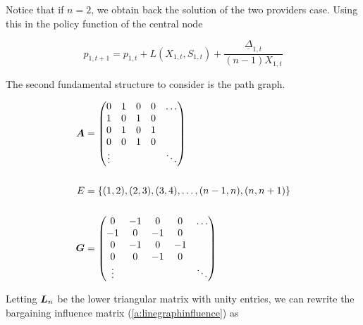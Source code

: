 Notice that if $n = 2$, we obtain back the solution of the two providers case. Using this in the policy function of the central node

\begin{equation} \label{policy_star}
  p_{1, t+1} = p_{1, t} + L(X_{1, t}, S_{1, t}) + \frac{\underline{\Delta}_{1, t}}{(n-1) X_{1, t}}
\end{equation}

The second fundamental structure to consider is the path graph.

\vspace{5mm}
\begin{minipage}{.5\textwidth}
  \resizebox{\textwidth}{!}{}
\end{minipage}
\begin{minipage}{.5\textwidth}
  \begin{equation*}
    \begin{split}
      \matr{A} &= \begin{pmatrix}
        0      & 1 & 0 & 0 & \ldots \\
        1      & 0 & 1 & 0 &        \\
        0      & 1 & 0 & 1 &        \\
        0      & 0 & 1 & 0 &        \\
        \vdots &   &   &   & \ddots
      \end{pmatrix} \\
      \vspace{5mm} \\
      E &= \set{(1, 2), (2, 3), (3, 4), \ldots, (n-1, n), (n, n+1)} \\
      \vspace{5mm} \\
      \G &= \begin{pmatrix}
        0      & -1 & 0  & 0  & \ldots \\
        -1     & 0  & -1 & 0  &        \\
        0      & -1 & 0  & -1 &        \\
        0      & 0  & -1 & 0  &        \\
        \vdots &    &    &    & \ddots
      \end{pmatrix}
    \end{split}
  \end{equation*}
\end{minipage}
\vspace{5mm}

Letting $\bm{L}_n$ be the lower triangular matrix with unity entries, we can rewrite the bargaining influence matrix (\ref{a:linegraphinfluence}) as

